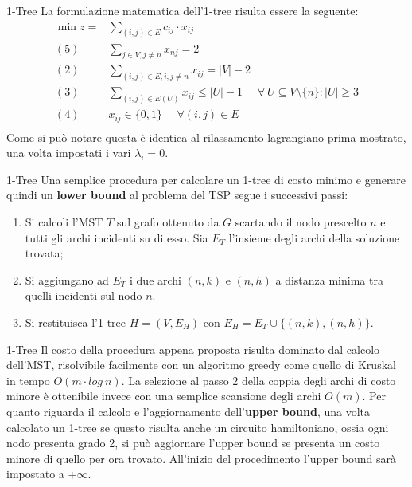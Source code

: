 \documentclass[10pt]{beamer}
\begin{document}
\begin{frame}{1-Tree}
    La formulazione matematica dell'1-tree risulta essere la seguente:
\begin{equation*}
    \begin{split}
        \min z = & \sum_{(i,j) \in E} c_{ij} \cdot x_{ij}\\
        (5)\:\:\:\:\:\: & \sum_{j \in V, j \neq n} x_{nj} = 2 \\
        (2) \:\:\:\:\:\: & \sum_{(i,j)\in E, i, j \neq n} x_{ij} = |V|-2 \\
        (3) \:\:\:\:\:\: & \sum_{(i,j) \in E(U)} x_{ij} \leq |U| - 1 \:\:\:\:\:\: \forall\: U \subseteq V\setminus\{n\} : |U| \geq 3 \\
        (4) \:\:\:\:\:\: & x_{ij} \in \{0,1\} \:\:\:\:\:\: \forall (i,j) \in E\\
    \end{split}
\end{equation*}
Come si può notare questa è identica al rilassamento lagrangiano prima mostrato, una volta impostati i vari $\lambda_i = 0$.
\end{frame}

\begin{frame}{1-Tree}
    Una semplice procedura per calcolare un 1-tree di costo minimo e generare quindi un \textbf{lower bound} al problema del TSP segue i successivi passi:
    \begin{enumerate}
        \item Si calcoli l'MST $T$ sul grafo ottenuto da $G$ scartando il nodo prescelto $n$ e tutti gli archi incidenti su di esso. Sia $E_T$ l'insieme degli archi della soluzione trovata;
        \item Si aggiungano ad $E_T$ i due archi $(n,k)$ e $(n,h)$ a distanza minima tra quelli incidenti sul nodo $n$.
        \item Si restituisca l'1-tree $H = (V, E_H)$ con $E_H = E_T \cup \{(n,k),(n,h)\}$.
    \end{enumerate}
\end{frame}

\begin{frame}{1-Tree}
    Il costo della procedura appena proposta risulta dominato dal calcolo dell'MST, risolvibile facilmente con un algoritmo greedy come quello di  Kruskal in tempo $O(m\cdot log\: n)$. La selezione al passo 2 della coppia degli archi di costo minore è ottenibile invece con una semplice scansione degli archi $O(m)$.
    \newline
    \newline
    Per quanto riguarda il calcolo e l'aggiornamento dell'\textbf{upper bound}, una volta calcolato un 1-tree se questo risulta anche un circuito hamiltoniano, ossia ogni nodo presenta grado 2, si può aggiornare l'upper bound se presenta un costo minore di quello per ora trovato. All'inizio del procedimento l'upper bound sarà impostato a $ + \infty$. 
\end{frame}
\end{document}
